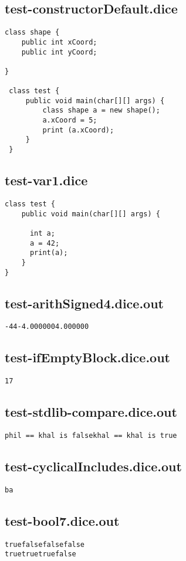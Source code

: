 \subsection{test-constructorDefault.dice}
\begin{verbatim}
class shape {
	public int xCoord;
	public int yCoord;
	
}

 class test {
	 public void main(char[][] args) {
		 class shape a = new shape();
		 a.xCoord = 5;
		 print (a.xCoord);
	 }
 }
\end{verbatim}
\pagebreak
\subsection{test-var1.dice}
\begin{verbatim}
class test {
	public void main(char[][] args) {

	  int a;
	  a = 42;
	  print(a);
	}
}

\end{verbatim}
\pagebreak
\subsection{test-arithSigned4.dice.out}
\begin{verbatim}
-44-4.0000004.000000
\end{verbatim}
\pagebreak
\subsection{test-ifEmptyBlock.dice.out}
\begin{verbatim}
17
\end{verbatim}
\pagebreak
\subsection{test-stdlib-compare.dice.out}
\begin{verbatim}
phil == khal is falsekhal == khal is true
\end{verbatim}
\pagebreak
\subsection{test-cyclicalIncludes.dice.out}
\begin{verbatim}
ba
\end{verbatim}
\pagebreak
\subsection{test-bool7.dice.out}
\begin{verbatim}
truefalsefalsefalse
truetruetruefalse
\end{verbatim}
\pagebreak
